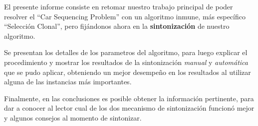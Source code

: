 El presente informe consiste en retomar nuestro trabajo principal
de poder resolver el ``Car Sequencing Problem'' con un algoritmo
inmune, más específico ``Selección Clonal'', pero fijándonos ahora
en la \textbf{sintonización} de nuestro algoritmo.

Se presentan los detalles de los parametros del algoritmo,
para luego explicar el procedimiento y mostrar los resultados
de la sintonización \emph{manual} y \emph{automática} que se pudo
aplicar, obteniendo un mejor desempeño en los resultados al utilizar
alguna de las instancias más importantes.

Finalmente, en las conclusiones es posible obtener la información
pertinente, para dar a conocer al lector cual de los dos mecanismo
de sintonización funcionó mejor y algunos consejos al momento
de sintonizar.
